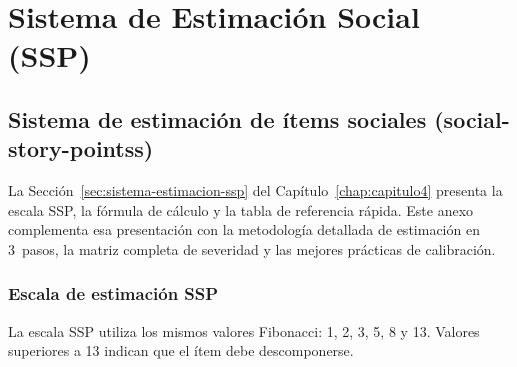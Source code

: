 \chapter{Sistema de Estimación Social (SSP)}
\label{anexo:sistema-estimacion-social}

\section{Sistema de estimación de ítems sociales (\glspl{social-story-points})}

La Sección~\ref{sec:sistema-estimacion-ssp} del Capítulo~\ref{chap:capitulo4} presenta la escala SSP, la fórmula de cálculo y la tabla de referencia rápida. Este anexo complementa esa presentación con la metodología detallada de estimación en 3~pasos, la matriz completa de severidad y las mejores prácticas de calibración.

\subsection{Escala de estimación SSP}

La escala SSP utiliza los mismos valores Fibonacci: 1, 2, 3, 5, 8 y 13. Valores superiores a 13 indican que el ítem debe descomponerse.

\begingroup
\scriptsize
\renewcommand{\arraystretch}{1.4}
\setlength{\tabcolsep}{4pt}
\setlength{\LTleft}{0pt}
\setlength{\LTright}{0pt}

